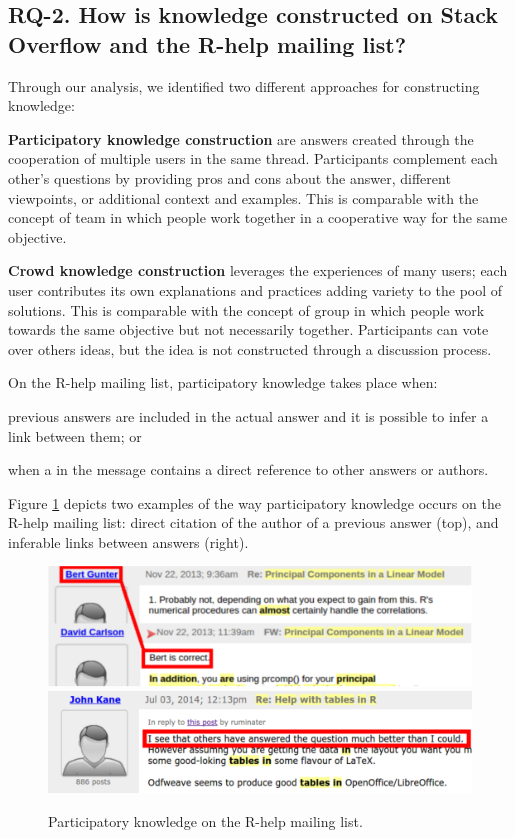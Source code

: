 \subsection{RQ-2. How is knowledge constructed on Stack Overflow and the R-help mailing list?}
\label{sec:rq2}

    Through our analysis, we identified two different approaches for constructing knowledge:

        \noindent\textbf{Participatory knowledge construction} are answers created through the cooperation of multiple users in the same thread.
        Participants complement each other's questions by providing pros and cons about the answer, different viewpoints, or additional context and examples.
        This is comparable with the concept of team in which people work together in a cooperative way for the same objective.

\noindent        \textbf{Crowd knowledge construction} leverages the experiences of many users; each user contributes its own explanations and practices adding variety to the pool of solutions.
        This is comparable with the concept of group in which people work towards the same objective but not necessarily together.
        Participants can vote over others ideas, but the idea is not constructed through a discussion process.
    
    On the R-help mailing list, participatory knowledge takes place when:
    \begin{enumerate*}[label=(\arabic*)]
    \item previous answers are included in the actual answer and it is possible to infer a link between them; or
    \item when a in the message contains a direct reference to other answers or authors.
    \end{enumerate*}
    Figure \ref{fig:ML-PK1} depicts two examples of the way participatory knowledge occurs on the R-help mailing list:
    direct citation of the author of a previous answer (top), and inferable links between answers (right).

    
    \begin{figure}[!htb]
        \centering
        \includegraphics[width=\columnwidth]{Figures/ML-PKimg2}
        \includegraphics[width=\columnwidth]{Figures/ML-PKimg11}
        \caption[Participatory knowledge on the R-help mailing list.]{Participatory knowledge on the R-help mailing list.}
        \label{fig:ML-PK1}
    \end{figure}

